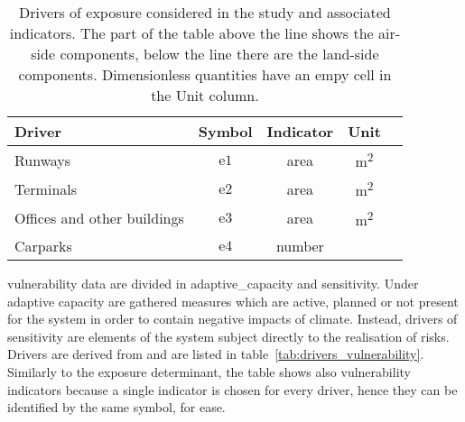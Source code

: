 \begin{table}
  \renewcommand*{\arraystretch}{1.5}
  \centering
  \caption{Drivers of exposure considered in the study and associated indicators. The part of the table above the line shows the air-side components, below the line there are the land-side components. Dimensionless quantities have an empy cell in the Unit column.}
  \label{tab:drivers_exposure}
  \begin{tabular}{p{}cccc}
    Driver                      & Symbol        & Indicator & Unit                 \\
    \hline
    Runways                     & $\mathrm{e1}$ & area      & \unit{\square\metre} \\
    \hline
    Terminals                   & $\mathrm{e2}$ & area      & \unit{\square\metre} \\
    Offices and other buildings & $\mathrm{e3}$ & area      & \unit{\square\metre} \\
    Carparks                    & $\mathrm{e4}$ & number    &                      \\
  \end{tabular}
\end{table}

\Gls{vulnerability} data are divided in \gls{adaptive_capacity} and \gls{sensitivity}. Under adaptive capacity are gathered measures which are active, planned or not present for the system in order to contain negative \glspl{impact} of climate. Instead, \glspl{driver} of sensitivity are elements of the system subject directly to the realisation of risks. Drivers are derived from \cite[555-556,558]{2022DeVivoRiskAssessment} and are listed in table~\ref{tab:drivers_vulnerability}. Similarly to the \gls{exposure} \gls{determinant}, the table shows also vulnerability \glspl{indicator} because a single indicator is chosen for every driver, hence they can be identified by the same symbol, for ease.

